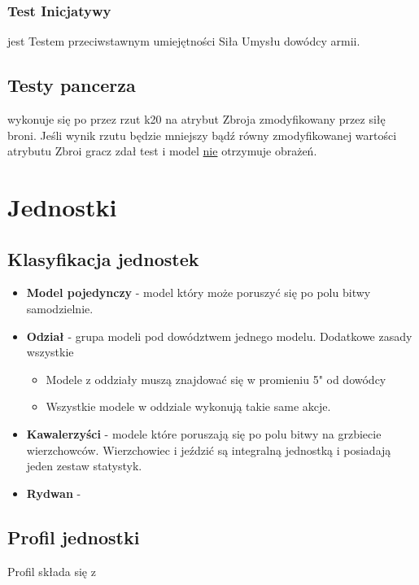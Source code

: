 \subsubsection{Test Inicjatywy} jest Testem przeciwstawnym umiejętności Siła Umysłu dowódcy armii. 

\subsection{Testy pancerza} wykonuje się po przez rzut k20 na atrybut Zbroja zmodyfikowany przez siłę broni. Jeśli wynik rzutu będzie mniejszy bądź równy zmodyfikowanej wartości atrybutu Zbroi gracz zdał test i model \underline{nie} otrzymuje obrażeń.

\section{Jednostki}
\label{link_jednostki} 

\subsection{Klasyfikacja jednostek}
\begin{itemize}
    \item \textbf{Model pojedynczy}  \label{sec:link_jednostki_model_pojedynczy} - model który może poruszyć się po polu bitwy samodzielnie.
    \item \textbf{Odział}  \label{sec:link_jednostki_odzial} - grupa modeli pod dowództwem jednego modelu.
    Dodatkowe zasady wszystkie
    \begin{itemize}
        \item Modele z oddziały muszą znajdować się w promieniu 5" od dowódcy
        \item Wszystkie modele w oddziale wykonują takie same akcje.
    \end{itemize}
    \item \textbf{Kawalerzyści}  \label{sec:link_jednostki_Kawalerzysci}  - modele które poruszają się po polu bitwy na grzbiecie wierzchowców. Wierzchowiec i jeździć są integralną jednostką i posiadają jeden zestaw statystyk.
    \item \textbf{Rydwan}  \label{sec:link_jednostki_Rydwan} - 
\end{itemize}

\subsection{Profil jednostki}
Profil składa się z

